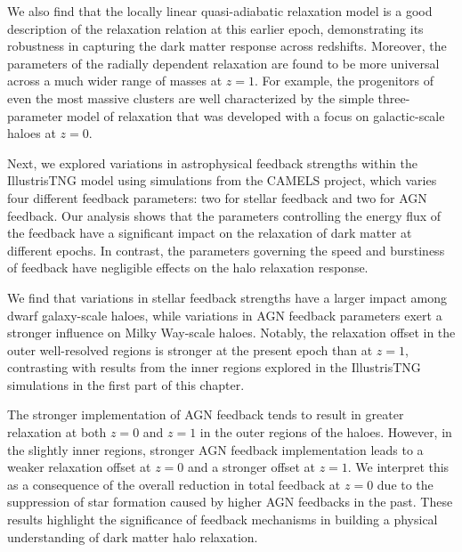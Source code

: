 We also find that the locally linear quasi-adiabatic relaxation model is a good description of the relaxation relation at this earlier epoch, demonstrating its robustness in capturing the dark matter response across redshifts. Moreover, the parameters of the radially dependent relaxation are found to be more universal across a much wider range of masses at \( z=1 \). For example, the progenitors of even the most massive clusters are well characterized by the simple three-parameter model of relaxation that was developed with a focus on galactic-scale haloes at \( z=0 \). 

Next, we explored variations in astrophysical feedback strengths within the IllustrisTNG model using simulations from the CAMELS project, which varies four different feedback parameters: two for stellar feedback and two for AGN feedback. Our analysis shows that the parameters controlling the energy flux of the feedback have a significant impact on the relaxation of dark matter at different epochs. In contrast, the parameters governing the speed and burstiness of feedback have negligible effects on the halo relaxation response.  

We find that variations in stellar feedback strengths have a larger impact among dwarf galaxy-scale haloes, while variations in AGN feedback parameters exert a stronger influence on Milky Way-scale haloes. Notably, the relaxation offset in the outer well-resolved regions is stronger at the present epoch than at \( z=1 \), contrasting with results from the inner regions explored in the IllustrisTNG simulations in the first part of this chapter.

The stronger implementation of AGN feedback tends to result in greater relaxation at both \( z=0 \) and \( z=1 \) in the outer regions of the haloes. However, in the slightly inner regions, stronger AGN feedback implementation leads to a weaker relaxation offset at \( z=0 \) and a stronger offset at \( z=1 \). We interpret this as a consequence of the overall reduction in total feedback at \( z=0 \) due to the suppression of star formation caused by higher AGN feedbacks in the past. These results highlight the significance of feedback mechanisms in building a physical understanding of dark matter halo relaxation.


